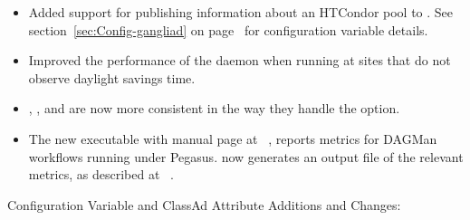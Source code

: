 \begin{itemize}

\item Added support for publishing information about an HTCondor pool 
to .
See section~\ref{sec:Config-gangliad} on 
page~\pageref{sec:Config-gangliad} for configuration variable details.

\item Improved the performance of the  daemon when running
at sites that do not observe daylight savings time.

\item {}, ,  and  are now 
more consistent in the way they handle the  option.

\item The new  executable
with manual page at ~\pageref{man-condor-dagman-metrics-reporter},
reports metrics for DAGMan workflows running under Pegasus.  
now generates an output file of the relevant metrics,
as described at ~\pageref{sec:DAGMetrics}.

\end{itemize}

\noindent Configuration Variable and ClassAd Attribute Additions and Changes:

